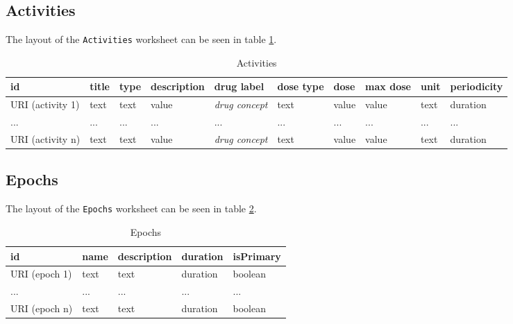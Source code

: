 \documentclass[a4paper,10pt]{article}
\begin{document}
\subsection*{Activities}
The layout of the \texttt{Activities} worksheet can be seen in table \ref{table:Activities}.
\begin{table}[h]
  \centering
  \caption{Activities}
  \small
  \label{table:Activities}
  \begin{tabular}{|l|l|l|l|l|l|l|l|l|l|}
    \hline
    \textbf{id}      & \textbf{title} & \textbf{type} & \textbf{description} & \textbf{drug label}   & \textbf{dose type} & \textbf{dose} & \textbf{max dose} & \textbf{unit} & \textbf{periodicity} \\ \hline
    URI (activity 1) & text           & text          & value                & \textit{drug concept} & text               & value         & value             & text          & duration             \\ \hline
    ...              & ...            & ...           & ...                  & ...                   & ...                & ...           & ...               & ...           & ...                  \\ \hline
    URI (activity n) & text           & text          & value                & \textit{drug concept} & text               & value         & value             & text          & duration             \\ \hline
  \end{tabular}
\end{table}

\subsection*{Epochs}
The layout of the \texttt{Epochs} worksheet can be seen in table \ref{table:Epochs}.
\begin{table}[h]
  \centering
  \caption{Epochs}
  \label{table:Epochs}
  \begin{tabular}{|l|l|l|l|l|}
    \hline
    \textbf{id} & \textbf{name} & \textbf{description} & \textbf{duration} & \textbf{isPrimary} \\ \hline
    URI (epoch 1)& text           & text                 & duration                & boolean  \\ \hline
    ...         & ...          & ...                 & ...                & ...  \\ \hline
    URI (epoch n)& text           & text                 & duration                & boolean  \\ \hline
  \end{tabular}
\end{table}
\end{document}
